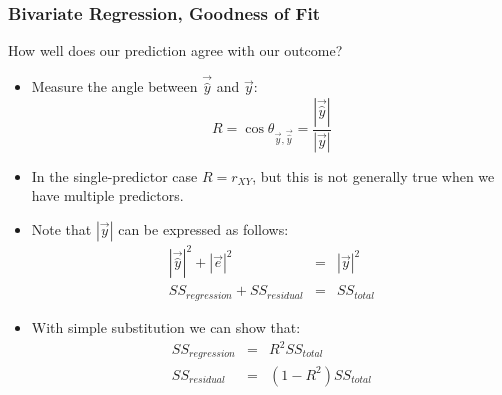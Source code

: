 \documentclass{beamer}
\begin{document}
\begin{frame}
  \frametitle{Bivariate Regression, Goodness of Fit}
  
How well does our prediction agree with our outcome?

\begin{itemize}
  \item Measure the angle between $\vec{\widehat{y}}$ and $\vec{y}$: 
\[
R = \cos \theta_{\vec{y},\vec{\widehat{y}}} = \frac{|\vec{\widehat{y}}|}{|\vec{y}|}
\]

 \item In the single-predictor case $R = r_{XY}$, but this is not generally true when we have multiple predictors.

 \item Note that $|\vec{y}|$ can be expressed as follows:
\begin{eqnarray*}
|\vec{\widehat{y}}|^2 + |\vec{e}|^2 &=& |\vec{y}|^2 \\
SS_\mathit{regression} + SS_\mathit{residual} &=& SS_\mathit{total}
\end{eqnarray*}

 \item With simple substitution we can show that:
\begin{eqnarray*}
SS_\mathit{regression} &=& R^2 SS_\mathit{total} \\
SS_\mathit{residual} &=& (1-R^2)SS_\mathit{total}
\end{eqnarray*}

\end{itemize}
  

\end{frame}
\end{document}
